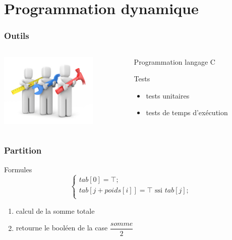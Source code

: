 \documentclass[french]{beamer}
\begin{document}
\section{Programmation dynamique}

\begin{frame}
  \frametitle{Outils}
  \begin{columns}
    \begin{column}[]{5cm}
      \begin{center}
        \includegraphics[height=3.5cm]{tools.jpeg}
      \end{center}
    \end{column}
      \begin{column}[]{5cm}
         \begin{block}{Programmation}
        langage C
      \end{block}
      \begin{block}{Tests}
        \begin{itemize}
        \item tests unitaires
        \item tests de temps d'exécution
        \end{itemize}
      \end{block}
      \end{column}
    \end{columns}
  \end{frame}

\begin{frame}
  \frametitle{Partition}
  \begin{alertblock}{Formules}
    \begin{equation}
      \begin{cases}
        tab[0] = \top ; \\
	tab[j + poids[i]] = \top \text{ ssi } tab[j] ; \\
      \end{cases}
    \end{equation}
  \end{alertblock}
\begin{enumerate}
\item calcul de la somme totale 
\item retourne le booléen de la case $\dfrac{somme}{2}$
\end{enumerate}
\end{frame}
\end{document}
